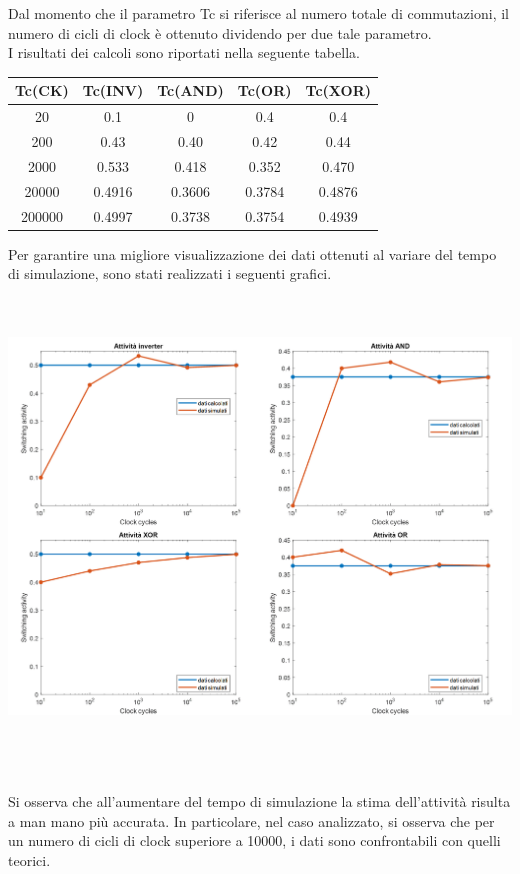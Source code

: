 \documentclass[10pt,  english, makeidx, a4paper, titlepage, oneside]{book}
\begin{document}
Dal momento che il parametro Tc si riferisce al numero totale di 
commutazioni, il numero di cicli di clock è ottenuto dividendo per due
tale parametro.
\\
I risultati dei calcoli sono riportati nella seguente tabella. 
\\
\begin{center}
	\begin{tabular}{|c|c|c|c|c|}
	\hline
	Tc(CK) & Tc(INV) & Tc(AND) & Tc(OR) & Tc(XOR) \\ 
	\hline
	20 & 0.1 & 0 & 0.4 & 0.4 \\
	\hline
	200 & 0.43 & 0.40 & 0.42 & 0.44 \\
	\hline
	2000 & 0.533 & 0.418 & 0.352 & 0.470 \\
	\hline
	20000 & 0.4916 & 0.3606 & 0.3784 & 0.4876 \\
	\hline
	200000 & 0.4997 & 0.3738 & 0.3754 & 0.4939 \\
	\hline
	\end{tabular}
\end{center}
\vspace{0.3cm}
Per garantire una migliore visualizzazione dei dati ottenuti 
al variare del tempo di simulazione, sono stati realizzati 
i seguenti grafici.
\\\\\\
\centerline{\includegraphics[width=15cm]{./img/Lab_1/Es_1/Grafici_Es_1.png}}
\\\\\\
Si osserva che all'aumentare del tempo di simulazione la stima 
dell'attività risulta a man mano più accurata. In particolare, 
nel caso analizzato, si osserva che per un numero di cicli di clock 
superiore a 10000, i dati sono confrontabili con quelli teorici.
\pagebreak
\end{document}
